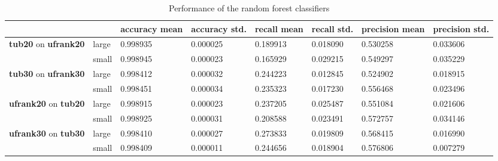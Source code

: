\documentclass[12pt,a4paper]{IEEEtran}
\begin{document}
\begin{table}
\caption{Performance of the random forest classifiers}
\label{tab:classifier_metrics}
\scriptsize
\renewcommand{\arraystretch}{0.8}
\begin{tabularx}{\columnwidth}{@{}p{4em}@{\,}l@{\,}XXXXXX}
\toprule
&
&accuracy mean &accuracy std. &recall mean &recall std. &precision mean &precision std.\\
\midrule
\multirow{2}{=}{\textbf{tub20} on \textbf{ufrank20}}
&large
&0.998935      &0.000025      &0.189913    &0.018090    &0.530258       &0.033606\\
&small
&0.998945      &0.000023      &0.165929    &0.029215    &0.549297       &0.035229\\
\midrule
\multirow{2}{=}{\textbf{tub30} on \textbf{ufrank30}}
&large
&0.998412      &0.000032      &0.244223    &0.012845    &0.524902       &0.018915\\
&small
&0.998451      &0.000034      &0.235323    &0.017230    &0.556468       &0.023496\\
\midrule
\multirow{2}{=}{\textbf{ufrank20} on \textbf{tub20}}
&large
&0.998915      &0.000023      &0.237205    &0.025487    &0.551084       &0.021606\\
&small
&0.998925      &0.000031      &0.208588    &0.023491    &0.572757       &0.034146\\
\midrule
\multirow{2}{=}{\textbf{ufrank30} on \textbf{tub30}}
&large
&0.998410      &0.000027      &0.273833    &0.019809    &0.568415       &0.016990\\
&small
&0.998409      &0.000011      &0.244656    &0.018904    &0.576806       &0.007279\\
\bottomrule
\end{tabularx}
\end{table}
\end{document}
